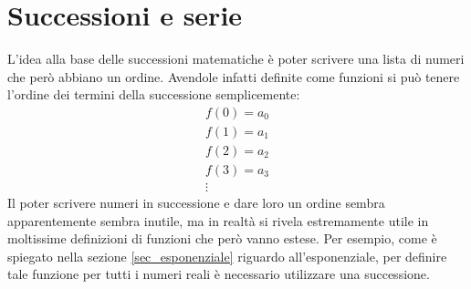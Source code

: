 \section{Successioni e serie} \label{sec_successioni}
L'idea alla base delle successioni matematiche è poter scrivere una lista di numeri che però abbiano un ordine. Avendole infatti definite come funzioni si può tenere l'ordine dei termini della successione semplicemente:
\begin{gather*}
    f(0) = a_0\\
    f(1) = a_1\\
    f(2) = a_2\\
    f(3) = a_3\\
    \vdots
\end{gather*}
Il poter scrivere numeri in successione e dare loro un ordine sembra apparentemente sembra inutile, ma in realtà si rivela estremamente utile in moltissime definizioni di funzioni che però vanno estese. Per esempio, come è spiegato nella sezione \ref{sec_esponenziale} riguardo all'esponenziale, per definire tale funzione per tutti i numeri reali è necessario utilizzare una successione.\\


